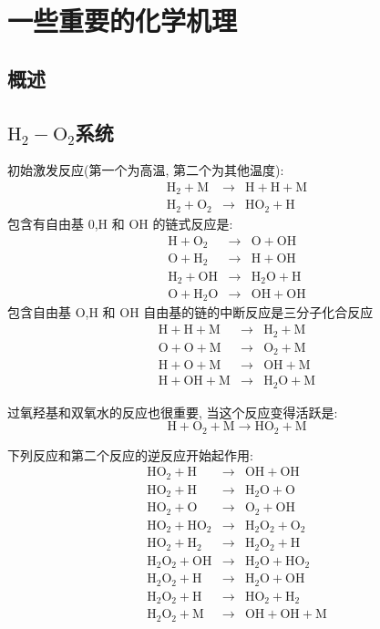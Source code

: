 \section{一些重要的化学机理}

\subsection{概述}
\subsection{\(\mathrm{H_2-O_2}\)系统}

\begin{multicols}{2}
{\fontsize{4}{1}\selectfont
初始激发反应(第一个为高温, 第二个为其他温度):
\begin{eqnarray}
    \mathrm{H_2+M}&\to&\mathrm{H+H+M}\\
    \mathrm{H_2+O_2}&\to&\mathrm{HO_2+H}\label{equ:activate}
\end{eqnarray}
包含有自由基 0,H 和 OH 的链式反应是:
\begin{eqnarray}
    \mathrm{H+O_2}&\to& \mathrm{O+OH}\label{equ:chain1}\\
    \mathrm{O + H_2}&\to& \mathrm{H + OH}\\
    \mathrm{H_2+OH}&\to& \mathrm{H_2O+H}\\
    \mathrm{O+H_2O}&\to& \mathrm{OH+OH}\label{equ:chain4}
\end{eqnarray}
包含自由基 O,H 和 OH 自由基的链的中断反应是三分子化合反应
\begin{eqnarray}
    \mathrm{H+H+M}&\to&\mathrm{H_2+M}\\
    \mathrm{O+O+M}&\to& \mathrm{O_2+M}\\
    \mathrm{H+O+M}&\to& \mathrm{OH + M}\\
    \mathrm{H + OH + M} &\to& \mathrm{H_2O + M}
\end{eqnarray}

过氧羟基和双氧水的反应也很重要, 当这个反应变得活跃是:
\begin{equation}\label{equ:HO2}
    \mathrm{H+O_2+M}\to \mathrm{HO_2 +M}
\end{equation}

下列反应和第二个反应的逆反应开始起作用:
\begin{eqnarray}
    \mathrm{HO_2+H} &\to& \mathrm{OH+OH} \\
    \mathrm{HO_2+H} &\to& \mathrm{H_2O+O} \\
    \mathrm{HO_2+O} &\to& \mathrm{O_2+OH} \\
    \mathrm{HO_2+HO_2} &\to& \mathrm{H_2O_2+O_2} \\
    \mathrm{HO_2+H_2} &\to& \mathrm{H_2O_2+H} \label{equ:H2O2}\\
    \mathrm{H_2O_2+OH} &\to& \mathrm{H_2O+HO_2} \\
    \mathrm{H_2O_2+H} &\to& \mathrm{H_2O+OH} \\
    \mathrm{H_2O_2+H} &\to& \mathrm{HO_2+H_2} \\
    \mathrm{H_2O_2+M} &\to& \mathrm{OH+OH+M}
\end{eqnarray}
}
\end{multicols}
